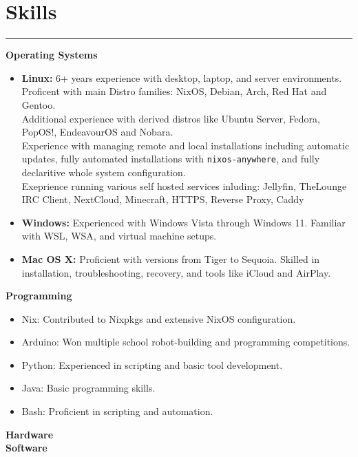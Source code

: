 \documentclass[a4paper,11pt]{article}
\begin{document}
\section*{\hspace*{1em} Skills}
\vspace{-0.2cm}
\hrule
\vspace{0.2cm}
\textbf{\hspace*{1em}Operating Systems} \\
\vspace{-0.5cm}
\begin{itemize}
    \item \textbf{Linux:} 6+ years experience with desktop, laptop, and server environments. \\
    Proficent with main Distro families: NixOS, Debian, Arch, Red Hat and Gentoo. \\
    Additional experience with derived distros like Ubuntu Server, Fedora, PopOS!, EndeavourOS and Nobara. \\ 
    Experience with managing remote and local installations including automatic updates, fully automated installations with \verb|nixos-anywhere|, and fully declaritive whole system configuration. \\
    Exeprience running various self hosted services inluding: Jellyfin, TheLounge IRC Client, NextCloud, Minecraft, HTTPS, Reverse Proxy, Caddy

    \vspace{-0.2cm}
    \item \textbf{Windows:} Experienced with Windows Vista through Windows 11.
    Familiar with WSL, WSA, and virtual machine setups.
\vspace{-0.2cm}
    \item \textbf{Mac OS X:} Proficient with versions from Tiger to Sequoia.
    Skilled in installation, troubleshooting, recovery, and tools like iCloud and AirPlay.
\end{itemize}
\textbf{\hspace*{1em}Programming} \\
\vspace{-0.5cm}
\begin{itemize}
    \item Nix: Contributed to Nixpkgs and extensive NixOS configuration.
\vspace{-0.2cm}
    \item Arduino: Won multiple school robot-building and programming competitions.
\vspace{-0.2cm}
    \item Python: Experienced in scripting and basic tool development.
\vspace{-0.2cm}
    \item Java: Basic programming skills.
\vspace{-0.2cm}
    \item Bash: Proficient in scripting and automation.
\end{itemize} 
\textbf{\hspace*{1em}Hardware} \\
\textbf{\hspace*{1em}Software} \\
\end{document}
